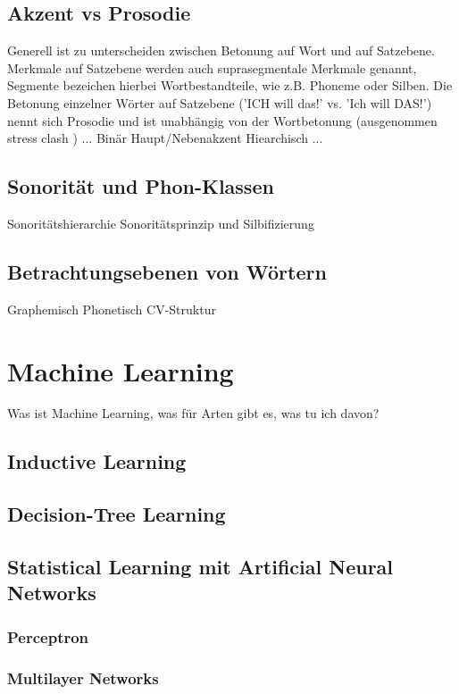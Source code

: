 \subsection{Akzent vs Prosodie}
Generell ist zu unterscheiden zwischen Betonung auf Wort und auf Satzebene. Merkmale auf Satzebene werden auch suprasegmentale Merkmale genannt, Segmente bezeichen hierbei Wortbestandteile, wie z.B. Phoneme oder Silben. Die Betonung einzelner Wörter auf Satzebene ('ICH will das!' vs. 'Ich will DAS!') nennt sich Prosodie und ist unabhängig von der Wortbetonung (ausgenommen stress clash \cite[S. Todo]{Hall2011})
...
Binär
Haupt/Nebenakzent
Hiearchisch
...

\subsection{Sonorität und Phon-Klassen}
Sonoritätshierarchie
Sonoritätsprinzip und Silbifizierung


\subsection{Betrachtungsebenen von Wörtern}
Graphemisch
Phonetisch
CV-Struktur


\section{Machine Learning}

Was ist Machine Learning, was für Arten gibt es, was tu ich davon?

\subsection{Inductive Learning}


\subsection{Decision-Tree Learning}


\subsection{Statistical Learning mit Artificial Neural Networks}

\subsubsection{Perceptron}

\subsubsection{Multilayer Networks}